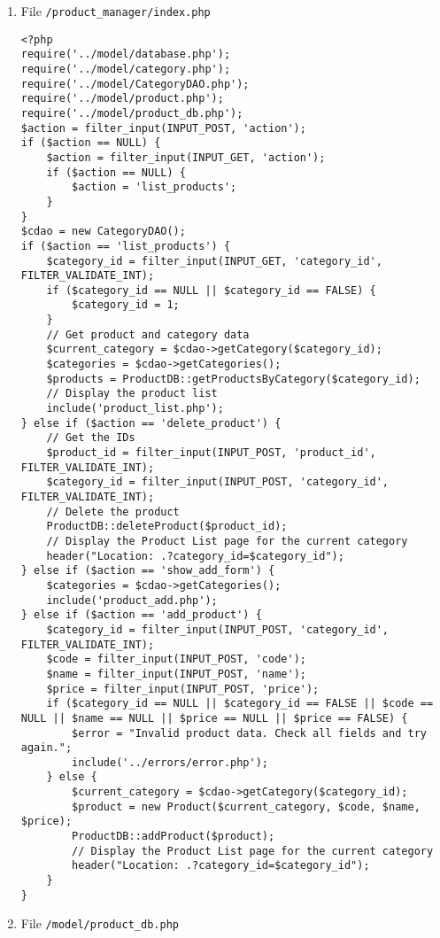 \begin{enumerate}
\item File \texttt{/product\_manager/index.php}
\lstset{language=php, tabsize=2}
\begin{lstlisting}
<?php
require('../model/database.php');
require('../model/category.php');
require('../model/CategoryDAO.php');
require('../model/product.php');
require('../model/product_db.php');
$action = filter_input(INPUT_POST, 'action');
if ($action == NULL) {
    $action = filter_input(INPUT_GET, 'action');
    if ($action == NULL) {
        $action = 'list_products';
    }
}
$cdao = new CategoryDAO();
if ($action == 'list_products') {
    $category_id = filter_input(INPUT_GET, 'category_id', FILTER_VALIDATE_INT);
    if ($category_id == NULL || $category_id == FALSE) {
        $category_id = 1;
    }
    // Get product and category data
    $current_category = $cdao->getCategory($category_id);
    $categories = $cdao->getCategories();
    $products = ProductDB::getProductsByCategory($category_id);
    // Display the product list
    include('product_list.php');
} else if ($action == 'delete_product') {
    // Get the IDs
    $product_id = filter_input(INPUT_POST, 'product_id', FILTER_VALIDATE_INT);
    $category_id = filter_input(INPUT_POST, 'category_id', FILTER_VALIDATE_INT);
    // Delete the product
    ProductDB::deleteProduct($product_id);
    // Display the Product List page for the current category
    header("Location: .?category_id=$category_id");
} else if ($action == 'show_add_form') {
    $categories = $cdao->getCategories();
    include('product_add.php');
} else if ($action == 'add_product') {
    $category_id = filter_input(INPUT_POST, 'category_id', FILTER_VALIDATE_INT);
    $code = filter_input(INPUT_POST, 'code');
    $name = filter_input(INPUT_POST, 'name');
    $price = filter_input(INPUT_POST, 'price');
    if ($category_id == NULL || $category_id == FALSE || $code == NULL || $name == NULL || $price == NULL || $price == FALSE) {
        $error = "Invalid product data. Check all fields and try again.";
        include('../errors/error.php');
    } else {
        $current_category = $cdao->getCategory($category_id);
        $product = new Product($current_category, $code, $name, $price);
        ProductDB::addProduct($product);
        // Display the Product List page for the current category
        header("Location: .?category_id=$category_id");
    }
}
\end{lstlisting}
\item File \texttt{/model/product\_db.php}
\lstset{language=php, tabsize=2}

\end{enumerate}
